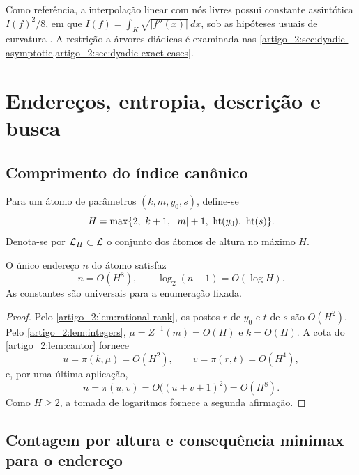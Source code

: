 Como referência, a interpolação linear com nós livres possui constante assintótica $I(f)^2/8$, em que $I(f)=\int_K\sqrt{|f''(x)|}\,dx$, sob as hipóteses usuais de curvatura \citep{artigo_1-deboor1973,artigo_1-burchard1974}. A restrição a árvores diádicas é examinada nas \cref{artigo_2:sec:dyadic-asymptotic,artigo_2:sec:dyadic-exact-cases}.

\section{Endereços, entropia, descrição e busca}
\label{artigo_2:sec:complexity}

\subsection{Comprimento do índice canônico}

Para um átomo de parâmetros $(k,m,y_0,s)$, define-se
\begin{equation}
 H=\max\{2,\ k+1,\ |m|+1,\ \height(y_0),\ \height(s)\}.
 \label{artigo_2:eq:atom-height}
\end{equation}
Denota-se por $\mathcal{L}_H\subset\mathcal{L}$ o conjunto dos átomos de altura no máximo $H$.

\begin{theorem}\label{map:artigo_2:3.1}\label{artigo_2:thm:index-bound}
O único endereço $n$ do átomo satisfaz
\begin{equation}
 n=O(H^8),\qquad \log_2(n+1)=O(\log H).
 \label{artigo_2:eq:index-bound}
\end{equation}
As constantes são universais para a enumeração fixada.
\end{theorem}

\begin{proof}
Pelo \cref{artigo_2:lem:rational-rank}, os postos $r$ de $y_0$ e $t$ de $s$ são $O(H^2)$. Pelo \cref{artigo_2:lem:integers}, $\mu=Z^{-1}(m)=O(H)$ e $k=O(H)$. A cota do \cref{artigo_2:lem:cantor} fornece
\[
 u=\pi(k,\mu)=O(H^2),\qquad v=\pi(r,t)=O(H^4),
\]
e, por uma última aplicação,
\[
 n=\pi(u,v)=O\bigl((u+v+1)^2\bigr)=O(H^8).
\]
Como $H\ge2$, a tomada de logaritmos fornece a segunda afirmação.
\end{proof}

\subsection{Contagem por altura e consequência minimax para o endereço}

